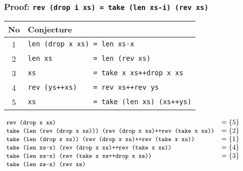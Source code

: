 \documentclass[serif,professionalfont]{beamer}
\begin{document}
\begin{frame}[fragile]
  \frametitle{Proof: \Large\texttt{rev (drop i xs) = take (len xs-i) (rev xs)}}
  \begin{center}
  \begin{tabular}{>{\small}c >{\small}l}
   No & Conjecture \\
   \hline
  1 & \verb!len (drop x xs) = len xs-x!               \\[-1pt]
  2 & \verb!len xs          = len (rev xs)!           \\[-1pt]
  3 & \verb!xs              = take x xs++drop x xs!   \\[-1pt]
  4 & \verb!rev (ys++xs)    = rev xs++rev ys!         \\[-1pt]
  5 & \verb!xs              = take (len xs) (xs++ys)!
  \end{tabular}
  \end{center}

  \begin{align*}
  & \hspace{-2em} \small \hs{rev (drop x xs)}                                                   & \small = \left\{ 5 \right\} \\[-3pt]
  & \hspace{-2em} \small \hs{take (len (rev (drop x xs))) (rev (drop x xs)++rev (take x xs))}   & \small = \left\{ 2 \right\} \\[-3pt]
  & \hspace{-2em} \small \hs{take (len (drop x xs)) (rev (drop x xs)++rev (take x xs))}         & \small = \left\{ 1 \right\} \\[-3pt]
  & \hspace{-2em} \small \hs{take (len xs-x) (rev (drop x xs)++rev (take x xs))}                & \small = \left\{ 4 \right\} \\[-3pt]
  & \hspace{-2em} \small \hs{take (len xs-x) (rev (take x xs++drop x xs))}                      & \small = \left\{ 3 \right\} \\[-3pt]
  & \hspace{-2em} \small \hs{take (len xs-x) (rev xs)}
  \end{align*}
\end{frame}
\end{document}
